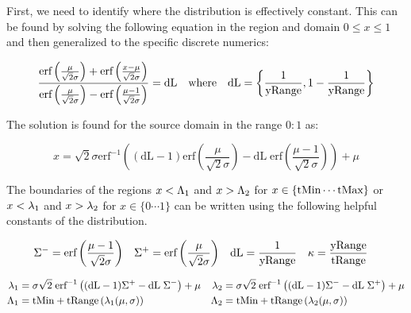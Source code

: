First, we need to identify where the distribution is effectively constant. This can be found by solving the following equation in the region and domain $0 \le x \le 1$ and then generalized to the specific discrete numerics:

\begin{equation}\label{eq:0to1}
 \frac{\text{erf}\left(\frac{\mu }{\sqrt{2} \sigma }\right)+\text{erf}\left(\frac{x-\mu }{\sqrt{2} \sigma }\right)}{\text{erf}\left(\frac{\mu }{\sqrt{2} \sigma }\right)-\text{erf}\left(\frac{\mu -1}{\sqrt{2} \sigma }\right)}=\text{dL} \quad \text{where} \quad \text{dL} = \left\{ \frac{1}{\text{yRange}}, 1 - \frac{1}{\text{yRange}} \right\}
\end{equation}


The solution is found for the source domain in the range $0:1$ as:


\begin{equation}\label{eq:LowHigh}
 x = \sqrt{2} \sigma  \text{erf}^{-1}\left((\text{dL}-1) \text{erf}\left(\frac{\mu }{\sqrt{2} \sigma }\right)-\text{dL} \; \text{erf}\left(\frac{\mu -1}{\sqrt{2} \sigma }\right)\right)+\mu
\end{equation}


The boundaries of the regions $x < \Lambda_1 $ and $ x > \Lambda_2$ for $x \in \{\text{tMin} \cdots \text{tMax} \}$ or $x< \lambda_1$  and $ x > \lambda_2$ for $x \in \{0 \cdots 1 \}$ can be written using the following helpful constants of the distribution.

\begin{align}\label{eq:DistributionConstants}
\Sigma^- &= \text{erf}\left(\frac{\mu -1}{\sqrt{2} \sigma }\right) &
 \Sigma^+ &= \text{erf}\left(\frac{\mu }{\sqrt{2} \sigma }\right) &
  \text{dL} &= \frac{1}{\text{yRange}} &
  \kappa &= \frac{\text{yRange}}{\text{tRange}} 
\end{align}

\begin{equation}\label{eq:DiscardedRegionBounds}
\begin{aligned}
\lambda_1 &= \sigma \sqrt{2} \; \text{erf}^{-1}\left((\text{dL}-1) \Sigma^+-\text{dL} \; \Sigma^-\right)+\mu  &            
\lambda_2 &= \sigma \sqrt{2} \; \text{erf}^{-1}\left((\text{dL}-1) \Sigma^- -\text{dL} \; \Sigma^+ \right)+\mu \\
\Lambda_1&= \text{tMin} + \text{tRange} \left( \lambda_1(\mu,\sigma) \right) & 
\Lambda_2 &= \text{tMin} + \text{tRange} \left( \lambda_2(\mu,\sigma) \right)
\end{aligned}
\end{equation}

